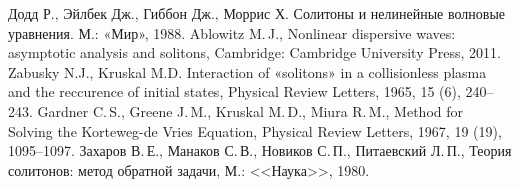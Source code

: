 \documentclass[12pt, a4paper]{report}
\begin{document}
\begin{thebibliography}{99}
	 Додд Р., Эйлбек Дж., Гиббон Дж., Моррис Х. Солитоны и нелинейные волновые уравнения. М.: «Мир», 1988.
	 Ablowitz M.\,J., Nonlinear dispersive waves: asymptotic analysis and solitons, Cambridge: Cambridge University Press, 2011.
	 Zabusky N.J., Kruskal M.D. Interaction of «solitons» in a collisionless plasma and the reccurence of initial states, Physical Review Letters, 1965, 15 (6), 240--243.
	 Gardner C.\,S., Greene J.\,M., Kruskal M.\,D., Miura R.\,M., Method for Solving the Korteweg-de Vries Equation, Physical Review Letters, 1967, 19 (19), 1095--1097.
	 Захаров В.\,Е., Манаков С.\,В., Новиков С.\,П., Питаевский Л.\,П., Теория солитонов: метод обратной задачи, М.: <<Наука>>, 1980. 
	

\end{thebibliography}
\end{document}
